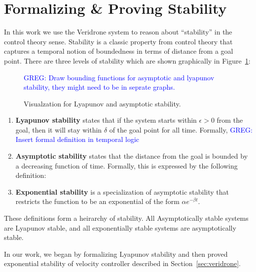 \documentclass[preprint]{sigplanconf}
\newcommand{\greg}[1]{\textcolor{blue}{\textsc{GREG}: #1}}
\begin{document}




\section{Formalizing \& Proving Stability}

In this work we use the Veridrone system to reason about ``stability'' in the control theory sense.
Stability is a classic property from control theory that captures a temporal notion of boundedness in terms of distance from a goal point.
There are three levels of stability which are shown graphically in Figure~\ref{fig:stability}:
\begin{figure}[b]

\greg{Draw bounding functions for asymptotic and lyapunov stability, they might need to be in seprate graphs.}

\caption{Visualzation for Lyapunov and asymptotic stability.}
\label{fig:stability}
\end{figure}
\begin{enumerate}
\item \textbf{Lyapunov stability} states that if the system starts within $\epsilon > 0$ from the goal, then it will stay within $\delta$ of the goal point for all time.
Formally,
\greg{Insert formal definition in temporal logic}

\item \textbf{Asymptotic stability} states that the distance from the goal is bounded by a decreasing function of time.
Formally, this is expressed by the following definition:

\item \textbf{Exponential stability} is a specialization of asymptotic stability that restricts the function to be an exponential of the form $\alpha e^{-\beta t}$.

\end{enumerate}

These definitions form a heirarchy of stability.
All Asymptotically stable systems are Lyapunov stable, and all exponentially stable systems are asymptotically stable.

In our work, we began by formalizing Lyapunov stability and then proved exponential stability of velocity controller described in Section~\ref{sec:veridrone}.
\end{document}
